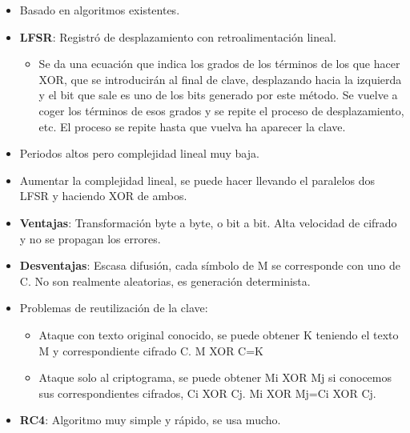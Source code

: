 \documentclass[12pt, twoside, openright]{report} %
\begin{document}
\begin{itemize}
    \begin{itemize}
    \item Basado en algoritmos existentes.
      
    \item \textbf{LFSR}: Registró de desplazamiento con retroalimentación
      lineal.
      

      \begin{itemize}
      \item Se da una ecuación que indica los grados de los términos de los
        que hacer XOR, que se introducirán al final de clave,
        desplazando hacia la izquierda y el bit que sale es uno de los
        bits generado por este método. Se vuelve a coger los términos de
        esos grados y se repite el proceso de desplazamiento, etc. El
        proceso se repite hasta que vuelva ha aparecer la clave.
        
      \end{itemize}
    \item Periodos altos pero complejidad lineal muy baja.
      
    \item Aumentar la complejidad lineal, se puede hacer llevando el
      paralelos dos LFSR y haciendo XOR de ambos.
      
    \item \textbf{Ventajas}: Transformación byte a byte, o bit a bit. Alta
      velocidad de cifrado y no se propagan los errores.
      
    \item \textbf{Desventajas}: Escasa difusión, cada símbolo de M se
      corresponde con uno de C. No son realmente aleatorias, es
      generación determinista.
      
    \item Problemas de reutilización de la clave:
      

      \begin{itemize}
      \item Ataque con texto original conocido, se puede obtener K teniendo
        el texto M y correspondiente cifrado C. M XOR C=K
        
      \item Ataque solo al criptograma, se puede obtener Mi XOR Mj si
        conocemos sus correspondientes cifrados, Ci XOR Cj. Mi XOR Mj=Ci
        XOR Cj.
        
      \end{itemize}
    \item \textbf{RC4}: Algoritmo muy simple y rápido, se usa mucho.
      


\end{itemize}
\end{itemize}
\end{document}
